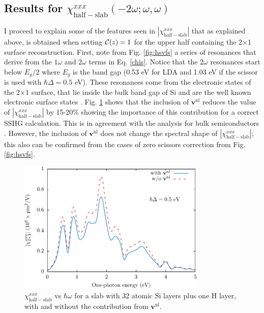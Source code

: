 \documentclass[11pt]{book}
\begin{document}

\subsection{
\texorpdfstring{Results for $\chi^{xxx}_{\mathrm{half-slab}}
(-2\omega;\omega,\omega)$}
{Results for Xxxx(half-slab)(-2w;w,w)}}

I proceed to explain some of the features seen in
$|\chi^{xxx}_{\mathrm{half-slab}}|$ that as explained above, is obtained when
setting ${\mathbf{\cal C}}(z)=1$ for the upper half containing the 2$\times$1
surface reconstruction. First, note from Fig. \ref{fig:hsvfs} a series of
resonances that derive from the $1\omega$ and $2\omega$ terms in Eq.
\eqref{chis}. Notice that the $2\omega$ resonances start below $E_{g}/2$ where
$E_{g}$ is the band gap (0.53 eV for LDA and 1.03 eV if the scissor is used with
$\hbar\Delta=0.5$ eV). These resonances come from the electronic states of the
2$\times$1 surface, that lie inside the bulk band gap of Si and are the well
known electronic surface states \cite{rohlfingPRB95}. Fig. \ref{fig:vnl} shows
that the inclusion of $\mathbf{v}^\mathrm{nl}$ reduces the value of
$|\chi^{xxx}_{\mathrm{half-slab}}|$ by 15-20\% showing the importance of this
contribution for a correct SSHG calculation. This is in agreement with the
analysis for bulk semiconductors \cite{luppiPRB08}. However, the inclusion of
$\mathbf{v}^\mathrm{nl}$ does not change the spectral shape of
$|\chi^{xxx}_{\mathrm{half-slab}}|$; this also can be confirmed from the cases
of zero scissors correction from Fig. \ref{fig:hsvfs}.

\begin{figure}
\centering 
\includegraphics[width=0.8\textwidth]{../figures/04-results/fig-4_1_04}
\caption{$\chi^{xxx}_{\mathrm{half-slab}}$ vs $\hbar\omega$ for a slab with 32
atomic Si layers plus one H layer, with and without the contribution from
$\mathbf{v}^\mathrm{nl}$.
\label{fig:vnl}} 
\end{figure}
\end{document}
